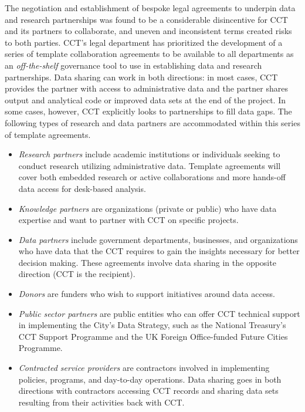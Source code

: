 The negotiation and establishment of bespoke legal agreements to underpin data and research partnerships was found to be a considerable disincentive for CCT and its partners to collaborate, and uneven and inconsistent terms created risks to both parties. CCT's legal department has prioritized the development of a series of template collaboration agreements to be available to all departments as an \emph{off-the-shelf} governance tool to use in establishing data and research partnerships. Data sharing can work in both directions: in most cases, CCT provides the partner with access to administrative data and the partner shares output and analytical code or improved data sets at the end of the project. In some cases, however, CCT explicitly looks to partnerships to fill data gaps. The following types of research and data partners are accommodated within this series of template agreements.

\begin{itemize}
\tightlist
\item
  \emph{Research partners} include academic institutions or individuals seeking to conduct research utilizing administrative data. Template agreements will cover both embedded research or active collaborations and more hands-off data access for desk-based analysis.
\item
  \emph{Knowledge partners} are organizations (private or public) who have data expertise and want to partner with CCT on specific projects.
\item
  \emph{Data partners} include government departments, businesses, and organizations who have data that the CCT requires to gain the insights necessary for better decision making. These agreements involve data sharing in the opposite direction (CCT is the recipient).
\item
  \emph{Donors} are funders who wish to support initiatives around data access.
\item
  \emph{Public sector partners} are public entities who can offer CCT technical support in implementing the City's Data Strategy, such as the National Treasury's CCT Support Programme and the UK Foreign Office-funded Future Cities Programme.
\item
  \emph{Contracted service providers} are contractors involved in implementing policies, programs, and day-to-day operations. Data sharing goes in both directions with contractors accessing CCT records and sharing data sets resulting from their activities back with CCT.
\end{itemize}


